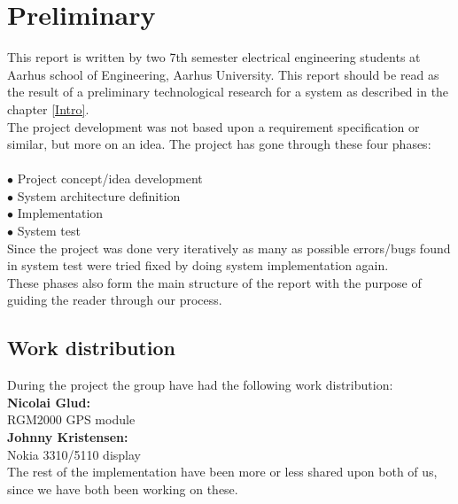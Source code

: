 \chapter{Preliminary}

This report is written by two 7th semester electrical engineering students at Aarhus school of Engineering, Aarhus University. This report should be read as the result of a preliminary technological research for a system as described in the chapter \ref{Intro}.\\
The project development was not based upon a requirement specification or similar, but more on an idea. The project has gone through these four phases:\\
\\
$\bullet$ Project concept/idea development\\
$\bullet$ System architecture definition\\
$\bullet$ Implementation\\
$\bullet$ System test\\

Since the project was done very iteratively as many as possible errors/bugs found in system test were tried fixed by doing system implementation again.\\
These phases also form the main structure of the report with the purpose of guiding the reader through our process.\\

\section{Work distribution}
During the project the group have had the following work distribution:\\
\textbf{Nicolai Glud:}\\
\hspace*{1cm} RGM2000 GPS module\\
\textbf{Johnny Kristensen:}\\
\hspace*{1cm} Nokia 3310/5110 display\\
The rest of the implementation have been more or less shared upon both of us, since we have both been working on these.